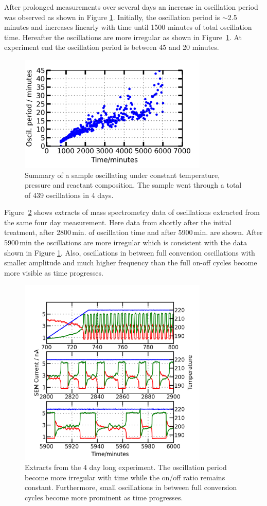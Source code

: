 \documentclass[8.5pt,twoside,twocolumn]{article}
\begin{document}
After prolonged measurements over several days an increase in oscillation period was observed as shown in Figure \ref{fgr:long_measurement}. Initially, the oscillation period is $\sim$2.5 minutes and increases linearly with time until 1500 minutes of total oscillation time. Hereafter the oscillations are more irregular as shown in Figure~\ref{fgr:long_measurement}. At experiment end the oscillation period is between 45 and 20 minutes.
\begin{figure}[h]
\centering
  \includegraphics[width=9cm]{summary_of_long_measurement.png}
  \caption{Summary of a sample oscillating under constant temperature, pressure and reactant composition. The sample went through a total of 439 oscillations in 4 days.}
  \label{fgr:long_measurement}
\end{figure}
  
Figure~\ref{fgr:extracts} shows extracts of mass spectrometry data of oscillations extracted from the same four day measurement. Here data from shortly after the initial treatment, after 2800\,min. of oscillation time and after 5900\,min. are shown. After 5900\,min the oscillations are more irregular which is consistent with the data shown in Figure \ref{fgr:long_measurement}. Also, oscillations in between full conversion oscillations with smaller amplitude and much higher frequency than the full on-off cycles become more visible as time progresses.
\begin{figure}[h]
  \centering
  \includegraphics[width=9cm]{extracts_from_very_long_oscillation.png}
  \caption{Extracts from the 4 day long experiment. The oscillation period become more irregular with time while the on/off ratio remains constant. Furthermore, small oscillations in between full conversion cycles become more prominent as time progresses.}
  \label{fgr:extracts}
\end{figure}
\end{document}
